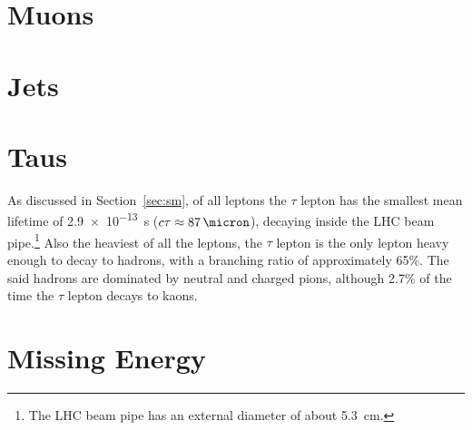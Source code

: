 	\section{Muons}
	\label{sec:mu}


	\section{Jets}
	\label{sec:jets}


	\section{Taus}
	\label{sec:tau}
\par As discussed in Section~\ref{sec:sm}, of all leptons the $\tau$ lepton has the smallest 
mean lifetime of \SI{2.9e-13}{\s} ($c\tau \approx \SI{87}{\micron}$), 
decaying inside the LHC beam pipe.\footnote{The LHC beam pipe has 
an external diameter of about 5.3~cm.}
Also the heaviest of all the leptons, the $\tau$ lepton is the only lepton 
heavy enough to decay to hadrons, with a branching ratio of approximately 
65\%. The said hadrons are dominated by neutral and charged pions, although 2.7\% of the 
time the $\tau$ lepton decays to kaons. 



	\section{Missing Energy}
	\label{sec:met}


